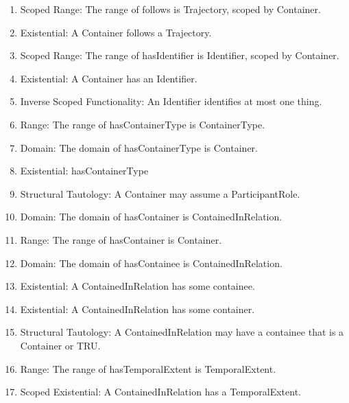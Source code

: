 \begin{enumerate}
    \item Scoped Range: The range of \textsf{follows} is \textsf{Trajectory}, scoped by \textsf{Container}.
    \item Existential: A \textsf{Container} \textsf{follows} a \textsf{Trajectory}.
    \item Scoped Range: The range of \textsf{hasIdentifier} is \textsf{Identifier}, scoped by \textsf{Container}.
    \item Existential: A \textsf{Container} has an \textsf{Identifier}.
    \item Inverse Scoped Functionality: An \textsf{Identifier} identifies at most one thing.
    \item Range: The range of \textsf{hasContainerType} is \textsf{ContainerType}.
    \item Domain: The domain of \textsf{hasContainerType} is \textsf{Container}.
    \item Existential: hasContainerType
    \item Structural Tautology: A \textsf{Container} may assume a \textsf{ParticipantRole}.
    \item Domain: The domain of \textsf{hasContainer} is \textsf{ContainedInRelation}.
    \item Range: The range of \textsf{hasContainer} is \textsf{Container}.
    \item Domain: The domain of \textsf{hasContainee} is \textsf{ContainedInRelation}.
    \item Existential: A \textsf{ContainedInRelation} has some containee.
    \item Existential: A \textsf{ContainedInRelation} has some container. 
    \item Structural Tautology: A \textsf{ContainedInRelation} may have a containee that is a \textsf{Container} or \textsf{TRU}.
    \item Range: The range of \textsf{hasTemporalExtent} is \textsf{TemporalExtent}.
    \item Scoped Existential: A \textsf{ContainedInRelation} has a \textsf{TemporalExtent}.
\end{enumerate}

